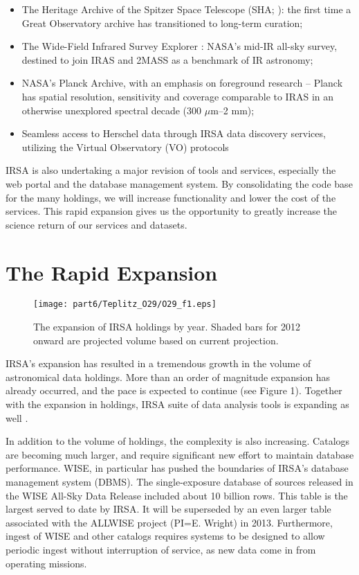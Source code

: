 \begin{itemize}

\item The Heritage Archive of the Spitzer Space Telescope (SHA; \citep{werner04}): the first time a
  Great Observatory archive has transitioned to long-term curation; 
\item The Wide-Field Infrared Survey Explorer \citep[WISE]{wright10}: NASA’s mid-IR all-sky survey, destined to
  join IRAS and 2MASS as a benchmark of IR astronomy; 
\item NASA's Planck Archive, with an emphasis on foreground research
  -- Planck \citet{planck11} has spatial resolution, sensitivity and coverage
  comparable to IRAS in an otherwise unexplored spectral decade (300
  $\mu$m–2 mm); 
\item Seamless access to Herschel data through IRSA data discovery
  services, utilizing the Virtual Observatory (VO) protocols

\end{itemize}

IRSA is also undertaking a
major revision of tools and services, especially the web portal and
the database management system. By consolidating the code base for the
many holdings, we will increase functionality and lower the cost of
the services. This rapid expansion gives us the opportunity to greatly
increase the science return of our services and datasets.

\section{The Rapid Expansion}

\begin{figure}[t]

\centering
\texttt{[image: part6/Teplitz\_O29/O29\_f1.eps]}
\caption{The expansion of IRSA holdings by year.  Shaded  bars for
  2012 onward are projected volume based on current projection.}

\end{figure}


IRSA's expansion has resulted in a tremendous growth in the volume of
astronomical data holdings.  More than an order of magnitude expansion
has already occurred, and the pace is expected to continue (see Figure
1).  Together with the expansion in holdings, IRSA suite of data analysis
tools is expanding as well \citep{teplitz12}.

In addition to the volume of holdings, the complexity is also
increasing.  Catalogs are becoming much larger, and require
significant new effort to maintain database performance.  WISE, in
particular has pushed the boundaries of IRSA's database management
system (DBMS).  The single-exposure database of sources released in
the WISE All-Sky Data Release included about 10 billion
rows.  This table is the largest served to date by IRSA. It will be
superseded by an even larger table associated with the ALLWISE project
(PI=E. Wright) in 2013.  Furthermore, ingest of WISE and other catalogs requires systems to be
designed to allow periodic ingest without interruption of service, as
new data come in from operating missions.  

